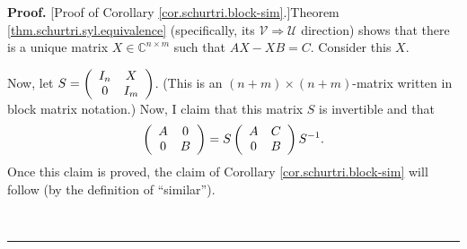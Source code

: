 \documentclass[numbers=enddot,12pt,final,onecolumn,notitlepage]{scrartcl}%
\numberwithin{exer}{subsection}
\theoremstyle{definition}
\newenvironment{proof}[1][Proof]{\noindent\textbf{#1.} }{\ \rule{0.5em}{0.5em}}
\begin{document}
\begin{proof}
[Proof of Corollary \ref{cor.schurtri.block-sim}.]Theorem
\ref{thm.schurtri.syl.equivalence} (specifically, its $\mathcal{V}%
\Longrightarrow\mathcal{U}$ direction) shows that there is a unique matrix
$X\in\mathbb{C}^{n\times m}$ such that $AX-XB=C$. Consider this $X$.

Now, let $S=\left(
\begin{array}
[c]{cc}%
I_{n} & X\\
0 & I_{m}%
\end{array}
\right)  $. (This is an $\left(  n+m\right)  \times\left(  n+m\right)
$-matrix written in block matrix notation.) Now, I claim that this matrix $S$
is invertible and that%
\[
\left(
\begin{array}
[c]{cc}%
A & 0\\
0 & B
\end{array}
\right)  =S\left(
\begin{array}
[c]{cc}%
A & C\\
0 & B
\end{array}
\right)  S^{-1}.
\]
Once this claim is proved, the claim of Corollary \ref{cor.schurtri.block-sim}
will follow (by the definition of \textquotedblleft similar\textquotedblright).


\end{proof}
\end{document}
